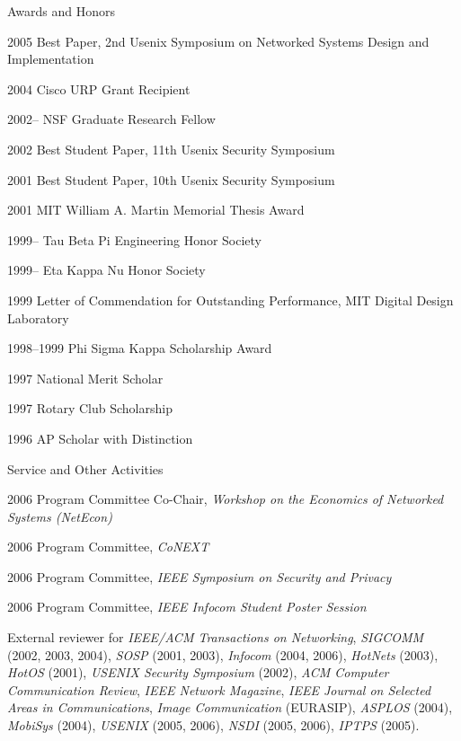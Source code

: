 \documentclass{article}
\begin{document}
\begin{cv}{}
\begin{cvlist}{{Awards and Honors}}
\item[2005] Best Paper, 2nd Usenix Symposium on Networked Systems Design
  and Implementation
\item[2004] Cisco URP Grant Recipient
\item[2002--] NSF Graduate Research Fellow
\item[2002] Best Student Paper, 11th Usenix Security Symposium
\item[2001] Best Student Paper, 10th Usenix Security Symposium
\item[2001] MIT William A. Martin Memorial Thesis Award
\item[1999--] Tau Beta Pi Engineering Honor Society
\item[1999--] Eta Kappa Nu Honor Society
\item[1999] Letter of Commendation for Outstanding Performance, MIT Digital
  Design Laboratory
\item[1998--1999] Phi Sigma Kappa Scholarship Award
\item[1997] National Merit Scholar
\item[1997] Rotary Club Scholarship
\item[1996] AP Scholar with Distinction

\end{cvlist}

\begin{cvlist}{{Service and Other Activities}}
\item[2006] Program Committee Co-Chair, {\em Workshop on the Economics of Networked Systems (NetEcon)}
\item[2006] Program Committee, {\em CoNEXT}
\item[2006] Program Committee, {\em IEEE Symposium on Security and Privacy}
\item[2006] Program Committee, {\em IEEE Infocom Student Poster Session}

\item External reviewer for {\em IEEE/ACM Transactions on Networking}, 
{\em SIGCOMM} (2002, 2003, 2004), 
{\em SOSP} (2001, 2003), 
{\em Infocom} (2004, 2006),
{\em HotNets} (2003), 
{\em HotOS} (2001), 
{\em USENIX Security Symposium} (2002), 
{\em  ACM Computer Communication Review}, 
{\em IEEE Network Magazine},  
{\em IEEE Journal on Selected Areas in Communications},
{\em Image Communication} (EURASIP), 
{\em ASPLOS} (2004), 
{\em MobiSys} (2004), 
{\em USENIX} (2005, 2006),
{\em NSDI} (2005, 2006), 
{\em IPTPS} (2005).  \\  


\end{cvlist}
\end{cv}
\end{document}
